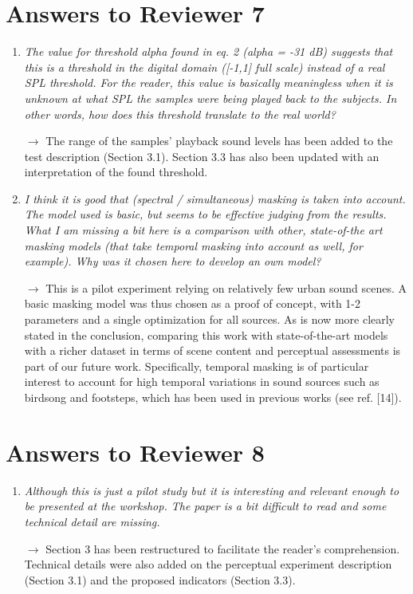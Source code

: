 \documentclass[10pt]{article}
\begin{document}
\section{Answers to Reviewer 7}

\begin{enumerate}

\item \emph{The value for threshold alpha found in eq. 2 (alpha = -31 dB) suggests that this is a threshold in the digital domain ([-1,1] full scale) instead of a real SPL threshold. For the reader, this value is basically meaningless when it is unknown at what SPL the samples were being played back to the subjects. In other words, how does this threshold translate to the real world?}

$\rightarrow$ The range of the samples' playback sound levels has been added to the test description (Section 3.1). Section 3.3 has also been updated with an interpretation of the found threshold.

\item \emph{I think it is good that (spectral / simultaneous) masking is taken into account. The model used is basic, but seems to be effective judging from the results. What I am missing a bit here is a comparison with other, state-of-the art masking models (that take temporal masking into account as well, for example). Why was it chosen here to develop an own model?}

$\rightarrow$ This is a pilot experiment relying on relatively few urban sound scenes. A basic masking model was thus chosen as a proof of concept, with 1-2 parameters and a single optimization for all sources. As is now more clearly stated in the conclusion, comparing this work with state-of-the-art models with a richer dataset in terms of scene content and perceptual assessments is part of our future work. Specifically, temporal masking is of particular interest to account for high temporal variations in sound sources such as birdsong and footsteps, which has been used in previous works (see ref. [14]).

\end{enumerate}

\section{Answers to Reviewer 8}

\begin{enumerate}

\item \emph{Although this is just a pilot study but it is interesting and relevant enough to be presented at the workshop. The paper is a bit difficult to read and some technical detail are missing.}

$\rightarrow$ Section 3 has been restructured to facilitate the reader's comprehension. Technical details were also added on the perceptual experiment description (Section 3.1) and the proposed indicators (Section 3.3).

\end{enumerate}
\end{document}
